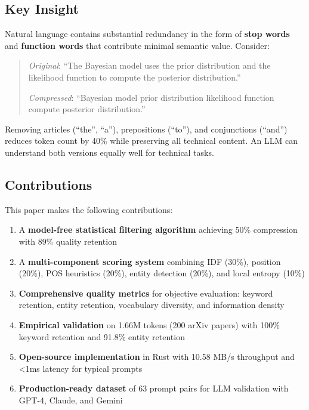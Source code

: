 \subsection{Key Insight}

Natural language contains substantial redundancy in the form of \textbf{stop words} and \textbf{function words} that contribute minimal semantic value. Consider:

\begin{quote}
\textit{Original}: ``The Bayesian model uses the prior distribution and the likelihood function to compute the posterior distribution.''

\textit{Compressed}: ``Bayesian model prior distribution likelihood function compute posterior distribution.''
\end{quote}

Removing articles (``the'', ``a''), prepositions (``to''), and conjunctions (``and'') reduces token count by 40\% while preserving all technical content. An LLM can understand both versions equally well for technical tasks.

\subsection{Contributions}

This paper makes the following contributions:

\begin{enumerate}
    \item A \textbf{model-free statistical filtering algorithm} achieving 50\% compression with 89\% quality retention
    \item A \textbf{multi-component scoring system} combining IDF (30\%), position (20\%), POS heuristics (20\%), entity detection (20\%), and local entropy (10\%)
    \item \textbf{Comprehensive quality metrics} for objective evaluation: keyword retention, entity retention, vocabulary diversity, and information density
    \item \textbf{Empirical validation} on 1.66M tokens (200 arXiv papers) with 100\% keyword retention and 91.8\% entity retention
    \item \textbf{Open-source implementation} in Rust with 10.58 MB/s throughput and <1ms latency for typical prompts
    \item \textbf{Production-ready dataset} of 63 prompt pairs for LLM validation with GPT-4, Claude, and Gemini
\end{enumerate}


